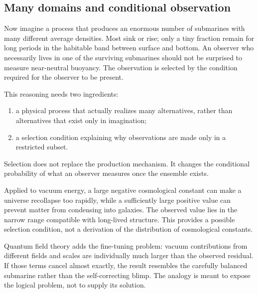 \subsection{Many domains and conditional observation}

Now imagine a process that produces an enormous number of submarines with many different average densities. Most sink or rise; only a tiny fraction remain for long periods in the habitable band between surface and bottom. An observer who necessarily lives in one of the surviving submarines should not be surprised to measure near-neutral buoyancy. The observation is selected by the condition required for the observer to be present.

This reasoning needs two ingredients:
\begin{enumerate}
\item a physical process that actually realizes many alternatives, rather than alternatives that exist only in imagination;
\item a selection condition explaining why observations are made only in a restricted subset.
\end{enumerate}
Selection does not replace the production mechanism. It changes the conditional probability of what an observer measures once the ensemble exists.

\begin{classroomqa}
\end{classroomqa}

Applied to vacuum energy, a large negative cosmological constant can make a universe recollapse too rapidly, while a sufficiently large positive value can prevent matter from condensing into galaxies. The observed value lies in the narrow range compatible with long-lived structure. This provides a possible selection condition, not a derivation of the distribution of cosmological constants.

Quantum field theory adds the fine-tuning problem: vacuum contributions from different fields and scales are individually much larger than the observed residual. If those terms cancel almost exactly, the result resembles the carefully balanced submarine rather than the self-correcting blimp. The analogy is meant to expose the logical problem, not to supply its solution.

